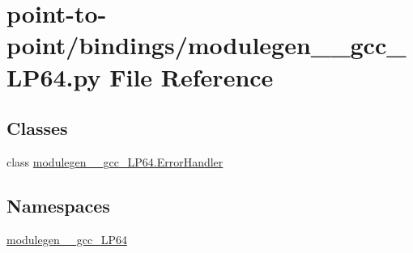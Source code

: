 \hypertarget{point-to-point_2bindings_2modulegen____gcc__LP64_8py}{}\section{point-\/to-\/point/bindings/modulegen\+\_\+\+\_\+gcc\+\_\+\+L\+P64.py File Reference}
\label{point-to-point_2bindings_2modulegen____gcc__LP64_8py}
\subsection*{Classes}
\begin{DoxyCompactItemize}
\item 
class \hyperlink{classmodulegen____gcc__LP64_1_1ErrorHandler}{modulegen\+\_\+\+\_\+gcc\+\_\+\+L\+P64.\+Error\+Handler}
\end{DoxyCompactItemize}
\subsection*{Namespaces}
\begin{DoxyCompactItemize}
\item 
 \hyperlink{namespacemodulegen____gcc__LP64}{modulegen\+\_\+\+\_\+gcc\+\_\+\+L\+P64}
\end{DoxyCompactItemize}
